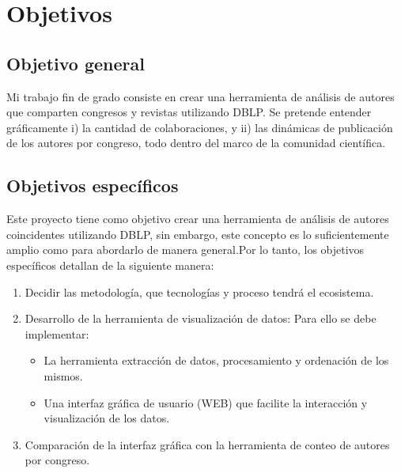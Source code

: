\documentclass[a4paper, 12pt]{book}
\begin{document}

\cleardoublepage %
\chapter{Objetivos} %
\label{chap:objetivos} %

\section{Objetivo general} %
\label{sec:objetivo-general} %


Mi trabajo fin de grado consiste en crear una herramienta de análisis de autores que comparten congresos y revistas utilizando DBLP.
Se pretende entender gráficamente i) la cantidad de colaboraciones, y ii) las dinámicas de publicación de los autores por congreso, todo dentro
del marco de la comunidad científica.



\section{Objetivos específicos}
\label{sec:objetivos-especificos}

Este proyecto tiene como objetivo crear una herramienta de análisis de autores coincidentes utilizando DBLP, sin embargo, 
este concepto es lo suficientemente amplio como para abordarlo de manera general.Por lo tanto, los objetivos específicos detallan
de la siguiente manera:

\begin{enumerate}
\item  Decidir las metodología, que tecnologías y proceso tendrá el ecosistema.

\item  Desarrollo de la herramienta de visualización de datos:
Para ello se debe implementar:

\begin{itemize}
  \item La herramienta extracción de datos, procesamiento y ordenación de los mismos.

  \item  Una interfaz gráfica de usuario (WEB) que facilite la interacción y visualización de los datos.

\end{itemize}

 \item Comparación de la interfaz gráfica con la herramienta de conteo de autores por congreso.
\end{enumerate}
\end{document}
